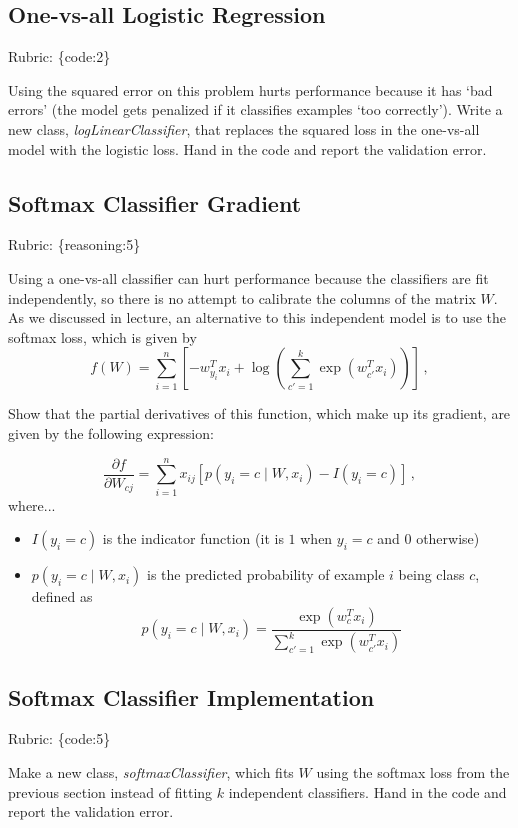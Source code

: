 \documentclass{article}
\def\rubric#1{\gre{Rubric: \{#1\}}}{}
\def\blu#1{{\color{blu}#1}}
\def\gre#1{{\color{gre}#1}}
\begin{document}
\subsection{One-vs-all Logistic Regression}
\rubric{code:2}

Using the squared error on this problem hurts performance because it has `bad errors' (the model gets penalized if it classifies examples `too correctly').
Write a new class, \emph{logLinearClassifier}, that replaces the squared loss in the one-vs-all model with the logistic loss. \blu{Hand in the code and report the validation error}.


\subsection{Softmax Classifier Gradient}
\rubric{reasoning:5}

Using a one-vs-all classifier can hurt performance because the classifiers are fit independently, so there is no attempt to calibrate the columns of the matrix $W$. As we discussed in lecture, an alternative to this independent model is to use the softmax loss, which is given by
\[
f(W) = \sum_{i=1}^n \left[-w_{y_i}^Tx_i + \log\left(\sum_{c' = 1}^k \exp(w_{c'}^Tx_i)\right)\right] \, ,
\]

\blu{Show that the partial derivatives of this function, which make up its gradient, are given by the following expression:}

\[
\frac{\partial f}{\partial W_{cj}} = \sum_{i=1}^n x_{ij}[p(y_i=c \mid W,x_i) - I(y_i = c)] \, ,
\]
where...
\begin{itemize}
\item $I(y_i = c)$ is the indicator function (it is $1$ when $y_i=c$ and $0$ otherwise)
\item $p(y_i=c \mid W, x_i)$ is the predicted probability of example $i$ being class $c$, defined as
\[
p(y_i=c \mid W, x_i) = \frac{\exp(w_c^Tx_i)}{\sum_{c'=1}^k\exp(w_{c'}^Tx_i)}
\]

\end{itemize}

\subsection{Softmax Classifier Implementation}
\rubric{code:5}

Make a new class, \emph{softmaxClassifier}, which fits $W$ using the softmax loss from the previous section instead of fitting $k$ independent classifiers. \blu{Hand in the code and report the validation error}.
\end{document}
